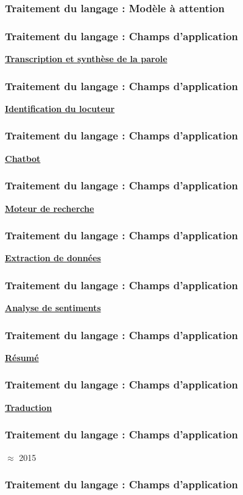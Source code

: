 \begin{frame}
  \frametitle{Traitement du langage : Modèle à attention} 
\end{frame}

\begin{frame}
  \frametitle{Traitement du langage : Champs d'application}
  \underline{\textbf{Transcription et synthèse de la parole}}
\end{frame}

\begin{frame}
  \frametitle{Traitement du langage : Champs d'application}
  \underline{\textbf{Identification du locuteur}}
\end{frame}

\begin{frame}
  \frametitle{Traitement du langage : Champs d'application}
  \underline{\textbf{Chatbot}}
\end{frame}

\begin{frame}
  \frametitle{Traitement du langage : Champs d'application}
  \underline{\textbf{Moteur de recherche}}
\end{frame}

\begin{frame}
  \frametitle{Traitement du langage : Champs d'application}
  \underline{\textbf{Extraction de données}}
\end{frame}

\begin{frame}
  \frametitle{Traitement du langage : Champs d'application}
  \underline{\textbf{Analyse de sentiments}}
\end{frame}

\begin{frame}
  \frametitle{Traitement du langage : Champs d'application}
  \underline{\textbf{Résumé}}
\end{frame}

\begin{frame}
  \frametitle{Traitement du langage : Champs d'application}
  \underline{\textbf{Traduction}}
  \begin{center}
  \end{center}
\end{frame}

\begin{frame}
  \frametitle{Traitement du langage : Champs d'application}
  \begin{center}
    $\approx$ 2015
  \end{center}
\end{frame}

\begin{frame}
  \frametitle{Traitement du langage : Champs d'application}
\end{frame}
